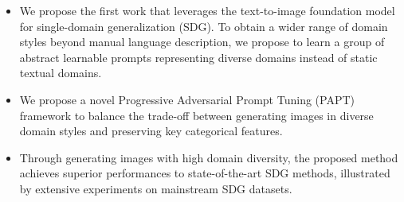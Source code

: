 \begin{itemize}
\item We propose the first work that leverages the text-to-image foundation model for single-domain generalization (SDG). To obtain a wider range of domain styles beyond manual language description, we propose to learn a group of abstract learnable prompts representing diverse domains instead of static textual domains.
\item %
We propose a novel Progressive Adversarial Prompt Tuning (PAPT) framework to balance the trade-off between generating images in diverse domain styles and preserving key categorical features. %
\item Through generating images with high domain diversity, the proposed method achieves superior performances to state-of-the-art SDG methods, illustrated by extensive experiments on mainstream SDG datasets. 
\end{itemize}

